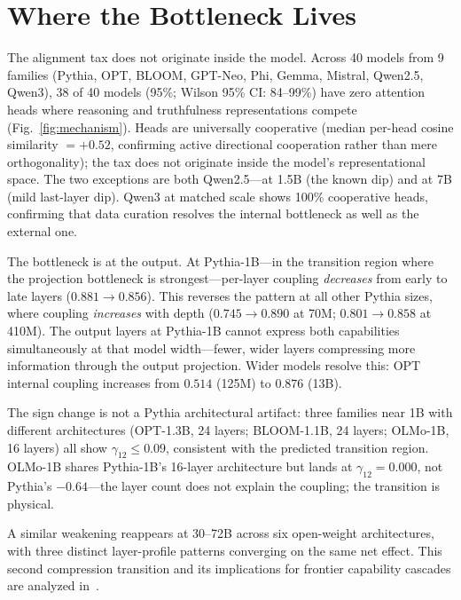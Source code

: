 \documentclass{article}
\begin{document}
\section{Where the Bottleneck Lives}
\label{sec:mechanism}

The alignment tax does not originate inside the model.
Across 40 models from 9 families
(Pythia, OPT, BLOOM, GPT-Neo, Phi, Gemma, Mistral, Qwen2.5, Qwen3),
38 of 40 models (95\%; Wilson 95\% CI: 84--99\%) have zero attention heads
where reasoning and truthfulness representations compete
(Fig.~\ref{fig:mechanism}).
Heads are universally cooperative (median per-head cosine similarity $= +0.52$,
confirming active directional cooperation rather than mere orthogonality);
the tax does not originate inside the model's representational space.
The two exceptions are both Qwen2.5---at 1.5B (the known dip) and at 7B (mild last-layer dip).
Qwen3 at matched scale shows 100\% cooperative heads, confirming that
data curation resolves the internal bottleneck as well as the external one.

The bottleneck is at the output.
At Pythia-1B---in the transition region where the projection bottleneck is strongest---per-layer coupling
\emph{decreases} from early to late layers ($0.881 \to 0.856$).
This reverses the pattern at all other Pythia sizes,
where coupling \emph{increases} with depth ($0.745 \to 0.890$ at 70M;
$0.801 \to 0.858$ at 410M).
The output layers at Pythia-1B cannot express both capabilities simultaneously
at that model width---fewer, wider layers
compressing more information through the output projection.
Wider models resolve this: OPT internal coupling increases
from $0.514$ (125M) to $0.876$ (13B).

The sign change is not a Pythia architectural artifact:
three families near 1B with different architectures
(OPT-1.3B, 24 layers; BLOOM-1.1B, 24 layers; OLMo-1B, 16 layers)
all show $\gamma_{12} \leq 0.09$, consistent with the predicted transition region.
OLMo-1B shares Pythia-1B's 16-layer architecture but lands at
$\gamma_{12} = 0.000$, not Pythia's $-0.64$---the
layer count does not explain the coupling; the transition is physical.

A similar weakening reappears at 30--72B across six open-weight architectures,
with three distinct layer-profile patterns converging on the same net effect.
This second compression transition and its implications for frontier capability cascades
are analyzed in~\cite{amin2026growing}.
\end{document}
